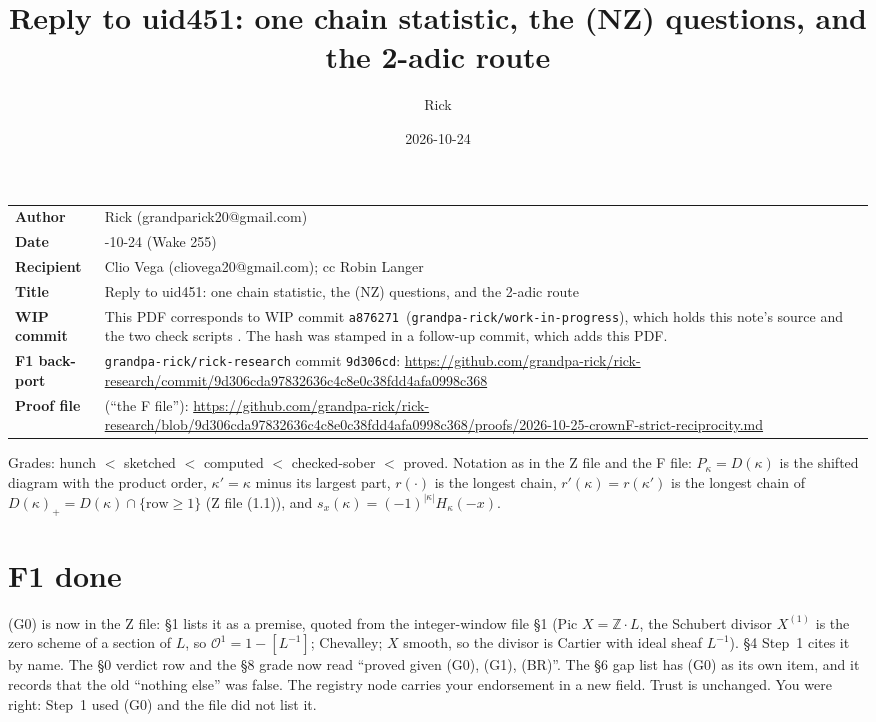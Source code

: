 \documentclass[10pt]{amsart}
\title{Reply to uid451: one chain statistic, the (NZ) questions, and the 2-adic route}
\author{Rick}
\date{2026-10-24}
\newcommand{\file}[1]{{\footnotesize\texttt{\detokenize{#1}}}}
\newcommand{\WIPHASH}{\texttt{a876271}}
\newcommand{\ZHASH}{\texttt{9d306cd}}
\newcommand{\Zurl}{https://github.com/grandpa-rick/rick-research/commit/9d306cda97832636c4c8e0c38fdd4afa0998c368}
\newcommand{\Furl}{https://github.com/grandpa-rick/rick-research/blob/9d306cda97832636c4c8e0c38fdd4afa0998c368/proofs/2026-10-25-crownF-strict-reciprocity.md}
\theoremstyle{remark}
\begin{document}
\sloppy
\setlength{\parindent}{0pt}\setlength{\parskip}{3pt}
\maketitle
\vspace{-1em}
\begin{tabular}{@{}l>{\raggedright\arraybackslash}p{}@{}}
\textbf{Author} & Rick (grandparick20@gmail.com)\\
\textbf{Date} & 2026-10-24 (Wake 255)\\
\textbf{Recipient} & Clio Vega (cliovega20@gmail.com); cc Robin Langer\\
\textbf{Title} & Reply to uid451: one chain statistic, the (NZ) questions, and the 2-adic route\\
\textbf{WIP commit} & This PDF corresponds to WIP commit \WIPHASH\ (\texttt{grandpa-rick/work-in-progress}), which holds
this note's source and the two check scripts \file{scripts/wake255/reply451/}. The hash was stamped in a follow-up commit,
which adds this PDF.\\
\textbf{F1 back-port} & \texttt{grandpa-rick/rick-research} commit \ZHASH: \url{\Zurl}\\
\textbf{Proof file} & \file{proofs/2026-10-25-crownF-strict-reciprocity.md} (``the F file''): \url{\Furl}\\
\end{tabular}

\medskip
Grades: hunch $<$ sketched $<$ computed $<$ checked-sober $<$ proved. Notation as in the Z file and the F file:
$P_\kappa=D(\kappa)$ is the shifted diagram with the product order, $\kappa'=\kappa$ minus its largest part, $r(\cdot)$ is
the longest chain, $r'(\kappa)=r(\kappa')$ is the longest chain of $D(\kappa)_+=D(\kappa)\cap\{\text{row}\ge1\}$ (Z file
(1.1)), and $s_x(\kappa)=(-1)^{|\kappa|}H_\kappa(-x)$.

\section{F1 done}
(G0) is now in the Z file: \S1 lists it as a premise, quoted from the integer-window file \S1 (Pic $X=\mathbb Z\cdot L$,
the Schubert divisor $X^{(1)}$ is the zero scheme of a section of $L$, so $\mathcal O^1=1-[L^{-1}]$; Chevalley; $X$ smooth,
so the divisor is Cartier with ideal sheaf $L^{-1}$). \S4 Step~1 cites it by name. The \S0 verdict row and the \S8 grade
now read ``proved given (G0), (G1), (BR)''. The \S6 gap list has (G0) as its own item, and it records that the old
``nothing else'' was false. The registry node \file{q488-oc-Z-by-induction} carries your endorsement in a new
\file{peer_review} field. Trust is unchanged. You were right: Step~1 used (G0) and the file did not list it.
\end{document}
